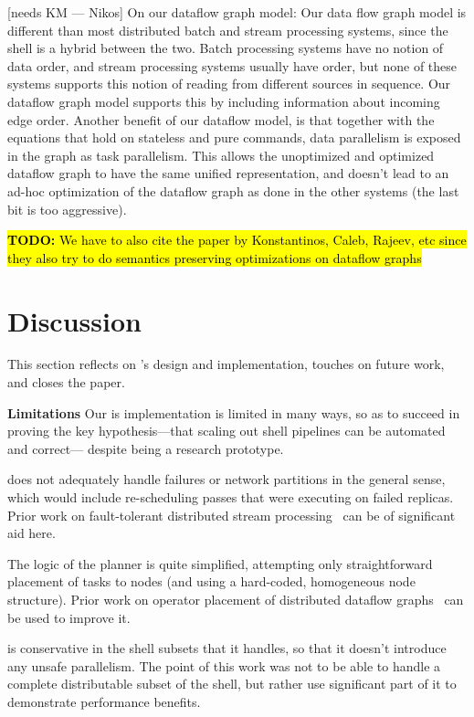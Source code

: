 \documentclass[sigplan,10pt,review,anonymous]{acmart}
\newcommand{\heading}[1]{\vspace{4pt}\noindent\textbf{#1}\enspace}
\newcommand{\TODO}[1]{\hl{\textbf{TODO:} #1}\xspace}
\newcommand{\nv}[1]{[{\color{cyan}#1 --- Nikos}]}
\begin{document}
\nv{needs KM}
On our dataflow graph model: Our data flow graph model is
  different than most distributed batch and stream processing systems,
  since the shell is a hybrid between the two. Batch processing
  systems have no notion of data order, and stream processing systems
  usually have order, but none of these systems supports this notion
  of reading from different sources in sequence. Our dataflow graph
  model supports this by including information about incoming edge
  order. Another benefit of our dataflow model, is that together with
  the equations that hold on stateless and pure commands, data
  parallelism is exposed in the graph as task parallelism. This allows
  the unoptimized and optimized dataflow graph to have the same
  unified representation, and doesn't lead to an ad-hoc optimization
  of the dataflow graph as done in the other systems (the last bit is
  too aggressive).

\TODO{We have to also cite the paper by Konstantinos, Caleb, Rajeev,
  etc since they also try to do semantics preserving optimizations on
  dataflow graphs}


\section{Discussion}
\label{discussion}

This section reflects on \sys's design and implementation, touches on future work, and closes the paper.

\heading{Limitations}
Our is implementation is limited in many ways, so as to succeed in proving the key hypothesis---that scaling out shell pipelines can be automated and correct--- despite \sys being a research prototype.

\sys does not adequately handle failures or network partitions in the general sense, which would include re-scheduling passes that were executing on failed replicas.
Prior work on fault-tolerant distributed stream processing~\cite{} can be of significant aid here.

The logic of the planner is quite simplified, attempting only straightforward placement of tasks to nodes (and using a hard-coded, homogeneous node structure).
Prior work on operator placement of distributed dataflow graphs~\cite{} can be used to improve it.

\sys is conservative in the shell subsets that it handles, so that it doesn't introduce any unsafe parallelism.
The point of this work was not to be able to handle a complete distributable
subset of the shell, but rather use significant part of it to demonstrate
performance benefits.
\end{document}
